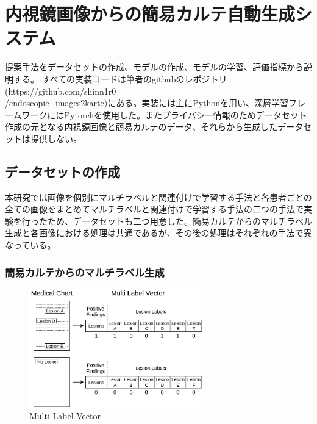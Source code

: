 \section{内視鏡画像からの簡易カルテ自動生成システム}
提案手法をデータセットの作成、モデルの作成、モデルの学習、評価指標から説明する。
すべての実装コードは筆者のgithubのレポジトリ (https://github.com/shinn1r0\\/endoscopic\_images2karte)にある。実装には主にPythonを用い、深層学習フレームワークにはPytorchを使用した。またプライバシー情報のためデータセット作成の元となる内視鏡画像と簡易カルテのデータ、それらから生成したデータセットは提供しない。
\subsection{データセットの作成}
本研究では画像を個別にマルチラベルと関連付けで学習する手法と各患者ごとの全ての画像をまとめてマルチラベルと関連付けで学習する手法の二つの手法で実験を行ったため、データセットも二つ用意した。簡易カルテからのマルチラベル生成と各画像における処理は共通であるが、その後の処理はそれぞれの手法で異なっている。
\subsubsection{簡易カルテからのマルチラベル生成}

\begin{figure}[tb]
    \begin{center}
        \includegraphics[width=75mm]{./fig/ieice1.png}
        \caption{Multi Label Vector}
        \label{fig:multilabel}
    \end{center}
\end{figure}

